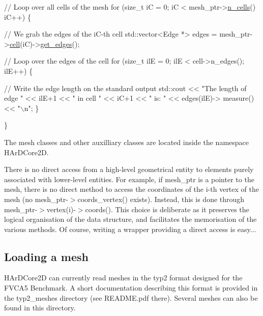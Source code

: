 \begin{DoxyCode}
\textcolor{comment}{// Loop over all cells of the mesh}
\textcolor{keywordflow}{for} (\textcolor{keywordtype}{size\_t} iC = 0; iC < mesh\_ptr->\hyperlink{group__Mesh_ga2202a0715196c41356692d8adcfe3893}{n\_cells}() iC++) \{

    \textcolor{comment}{// We grab the edges of the iC-th cell}
    std::vector<Edge *> edges = mesh\_ptr->\hyperlink{classHArDCore2D_1_1Mesh_ae07b938c57cf57e3bb9c76d3df1eb549}{cell}(iC)->\hyperlink{classHArDCore2D_1_1Cell_abac3633d6b17df44320054664d9581b1}{get\_edges}();

    \textcolor{comment}{// Loop over the edges of the cell}
    \textcolor{keywordflow}{for} (\textcolor{keywordtype}{size\_t} ilE = 0; ilE < cell->n\_edges(); ilE++) \{

        \textcolor{comment}{// Write the edge length on the standard output}
        std::cout << \textcolor{stringliteral}{"The length of edge "} << ilE+1 << \textcolor{stringliteral}{" in cell "} << iC+1 << \textcolor{stringliteral}{" is: "} << edges(ilE)->
      measure() << \textcolor{stringliteral}{"\(\backslash\)n"};
    \}

\}
\end{DoxyCode}


The mesh classes and other auxilliary classes are located inside the namespace H\+Ar\+D\+Core2D.

There is no direct access from a high-\/level geometrical entity to elements purely associated with lower-\/level entities. For example, if {\ttfamily mesh\+\_\+ptr} is a pointer to the mesh, there is no direct method to access the coordinates of the i-\/th vertex of the mesh (no {\ttfamily mesh\+\_\+ptr-\/$>$coords\+\_\+vertex()} exists). Instead, this is done through {\ttfamily mesh\+\_\+ptr-\/$>$vertex(i)-\/$>$coords()}. This choice is deliberate as it preserves the logical organisation of the data structure, and facilitates the memorisation of the various methods. Of course, writing a wrapper providing a direct access is easy...\hypertarget{index_loading_mesh}{}\subsection{Loading a mesh}\label{index_loading_mesh}
H\+Ar\+D\+Core2D can currently read meshes in the {\ttfamily typ2} format designed for the F\+V\+C\+A5 Benchmark. A short documentation describing this format is provided in the {\ttfamily typ2\+\_\+meshes} directory (see R\+E\+A\+D\+M\+E.\+pdf there). Several meshes can also be found in this directory.

